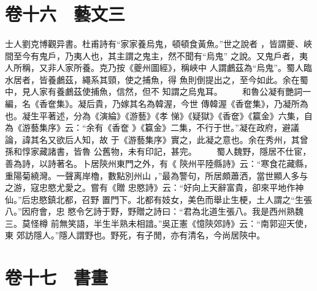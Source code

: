 \documentclass{ctexart}
\begin{document}
\section{卷十六　藝文三}
\paragraph{}
士人劉克博觀异書。杜甫詩有``家家養烏鬼，頓頓食黃魚。''世之說者 ，皆謂夔、峽間至今有鬼戶，乃夷人也，其主謂之鬼主，然不聞有``烏鬼'' 之說。又鬼戶者，夷人所稱，又非人家所養。克乃按《夔州圖經》，稱峽中 人謂鸕茲為``烏鬼''。蜀人臨水居者，皆養鸕茲，繩系其頸，使之捕魚，得 魚則倒提出之，至今如此。余在蜀中，見人家有養鸕茲使捕魚，信然，但不 知謂之烏鬼耳。 　　和魯公凝有艷詞一編，名《香奩集》。凝后貴，乃嫁其名為韓渥，今世 傳韓渥《香奩集》，乃凝所為也。凝生平著述，分為《演綸》《游藝》《孝 悌》《疑獄》《香奩》《籯金》六集，自為《游藝集序》云：``余有《香奩 》《籯金》二集，不行于世。''凝在政府，避議論，諱其名又欲后人知，故 于《游藝集序》實之，此凝之意也。余在秀州，其曾孫和惇家藏諸書，皆魯 公舊物，未有印記，甚完。 　　蜀人魏野，隱居不仕宦，善為詩，以詩著名。卜居陝州東門之外，有《 陝州平陸縣詩》云：``寒食花藏縣，重陽菊繞灣。一聲离岸櫓，數點別州山 ，''最為警句，所居頗蕭洒，當世顯人多与之游，寇忠愍尤愛之。嘗有《贈 忠愍詩》云：``好向上天辭富貴，卻來平地作神仙。''后忠愍鎮北都，召野 置門下。北都有妓女，美色而舉止生梗，土人謂之``生張八。''因府會，忠 愍令乞詩于野，野贈之詩曰：``君為北道生張八。我是西州熟魏三。莫怪樽 前無笑語，半生半熟未相諳。''吳正憲《憶陝郊詩》云：``南郭迎天使，東 郊訪隱人。''隱人謂野也。野死，有子閒，亦有清名，今尚居陝中。
\clearpage
\section{卷十七　書畫}
\end{document}
